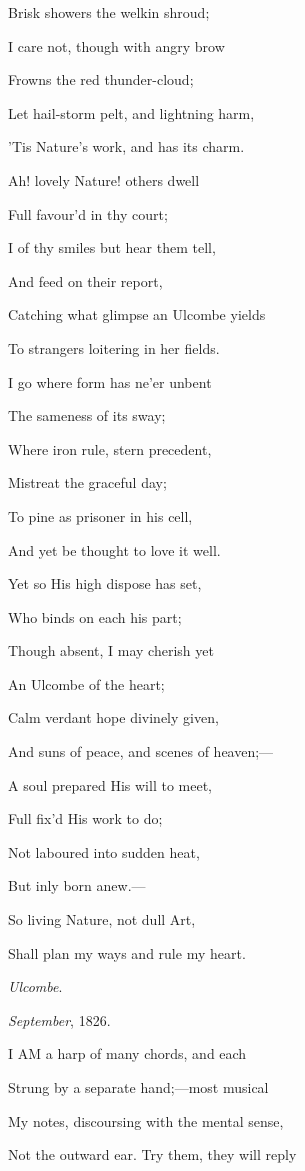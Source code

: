 Brisk showers the welkin shroud;

I care not, though with angry brow

Frowns the red thunder-cloud;

Let hail-storm pelt, and lightning harm,

'Tis Nature's work, and has its charm.

Ah! lovely Nature! others dwell

Full favour'd in thy court;

I of thy smiles but hear them tell,

And feed on their report,

Catching what glimpse an Ulcombe yields

To strangers loitering in her fields. 

I go where form has ne'er unbent

The sameness of its sway;

Where iron rule, stern precedent,

Mistreat the graceful day;

To pine as prisoner in his cell,

And yet be thought to love it well.

Yet so His high dispose has set,

Who binds on each his part;

Though absent, I may cherish yet

An Ulcombe of the heart;

Calm verdant hope divinely given,

And suns of peace, and scenes of heaven;—

A soul prepared His will to meet,

Full fix'd His work to do;

Not laboured into sudden heat,

But inly born anew.—

So living Nature, not dull Art,

Shall plan my ways and rule my heart.

\emph{Ulcombe}.

\emph{September}, 1826.


I AM a harp of many chords, and each

Strung by a separate hand;—most musical

My notes, discoursing with the mental sense,

Not the outward ear. Try them, they will reply

